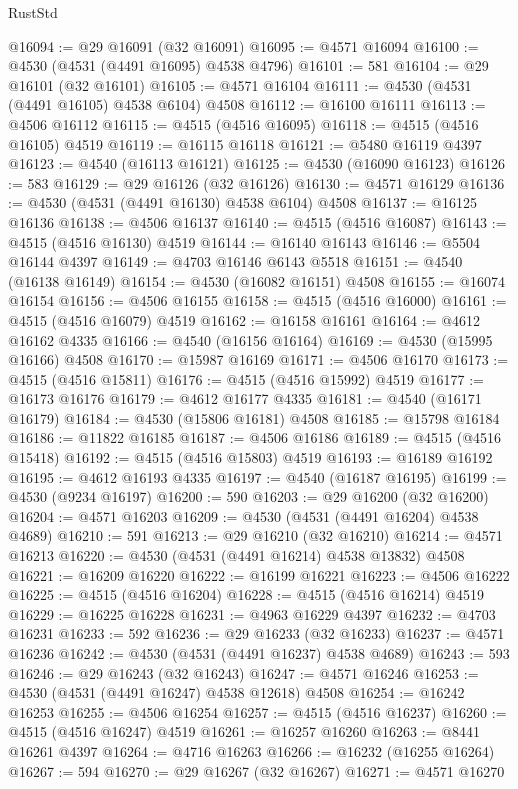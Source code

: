 \begin{lexlean}{RustStd}
\begin{coremodule}
@16094 := @29 @16091 (@32 @16091)
@16095 := @4571 @16094
@16100 := @4530 (@4531 (@4491 @16095) @4538 @4796)
@16101 := 581
@16104 := @29 @16101 (@32 @16101)
@16105 := @4571 @16104
@16111 := @4530 (@4531 (@4491 @16105) @4538 @6104) @4508
@16112 := @16100 @16111
@16113 := @4506 @16112
@16115 := @4515 (@4516 @16095)
@16118 := @4515 (@4516 @16105) @4519
@16119 := @16115 @16118
@16121 := @5480 @16119 @4397
@16123 := @4540 (@16113 @16121)
@16125 := @4530 (@16090 @16123)
@16126 := 583
@16129 := @29 @16126 (@32 @16126)
@16130 := @4571 @16129
@16136 := @4530 (@4531 (@4491 @16130) @4538 @6104) @4508
@16137 := @16125 @16136
@16138 := @4506 @16137
@16140 := @4515 (@4516 @16087)
@16143 := @4515 (@4516 @16130) @4519
@16144 := @16140 @16143
@16146 := @5504 @16144 @4397
@16149 := @4703 @16146 @6143 @5518
@16151 := @4540 (@16138 @16149)
@16154 := @4530 (@16082 @16151) @4508
@16155 := @16074 @16154
@16156 := @4506 @16155
@16158 := @4515 (@4516 @16000)
@16161 := @4515 (@4516 @16079) @4519
@16162 := @16158 @16161
@16164 := @4612 @16162 @4335
@16166 := @4540 (@16156 @16164)
@16169 := @4530 (@15995 @16166) @4508
@16170 := @15987 @16169
@16171 := @4506 @16170
@16173 := @4515 (@4516 @15811)
@16176 := @4515 (@4516 @15992) @4519
@16177 := @16173 @16176
@16179 := @4612 @16177 @4335
@16181 := @4540 (@16171 @16179)
@16184 := @4530 (@15806 @16181) @4508
@16185 := @15798 @16184
@16186 := @11822 @16185
@16187 := @4506 @16186
@16189 := @4515 (@4516 @15418)
@16192 := @4515 (@4516 @15803) @4519
@16193 := @16189 @16192
@16195 := @4612 @16193 @4335
@16197 := @4540 (@16187 @16195)
@16199 := @4530 (@9234 @16197)
@16200 := 590
@16203 := @29 @16200 (@32 @16200)
@16204 := @4571 @16203
@16209 := @4530 (@4531 (@4491 @16204) @4538 @4689)
@16210 := 591
@16213 := @29 @16210 (@32 @16210)
@16214 := @4571 @16213
@16220 := @4530 (@4531 (@4491 @16214) @4538 @13832) @4508
@16221 := @16209 @16220
@16222 := @16199 @16221
@16223 := @4506 @16222
@16225 := @4515 (@4516 @16204)
@16228 := @4515 (@4516 @16214) @4519
@16229 := @16225 @16228
@16231 := @4963 @16229 @4397
@16232 := @4703 @16231
@16233 := 592
@16236 := @29 @16233 (@32 @16233)
@16237 := @4571 @16236
@16242 := @4530 (@4531 (@4491 @16237) @4538 @4689)
@16243 := 593
@16246 := @29 @16243 (@32 @16243)
@16247 := @4571 @16246
@16253 := @4530 (@4531 (@4491 @16247) @4538 @12618) @4508
@16254 := @16242 @16253
@16255 := @4506 @16254
@16257 := @4515 (@4516 @16237)
@16260 := @4515 (@4516 @16247) @4519
@16261 := @16257 @16260
@16263 := @8441 @16261 @4397
@16264 := @4716 @16263
@16266 := @16232 (@16255 @16264)
@16267 := 594
@16270 := @29 @16267 (@32 @16267)
@16271 := @4571 @16270

\end{coremodule}
\end{lexlean}
